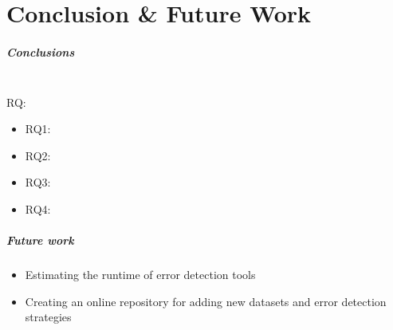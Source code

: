 \chapter{Conclusion \& Future Work}
\label{chap:conclusion}

\paragraph{Conclusions}
~\\RQ: 

\begin{itemize}
    \item RQ1:
    \item RQ2:
    \item RQ3:
    \item RQ4:
\end{itemize}

\paragraph{Future work}
\begin{itemize}
    \item Estimating the runtime of error detection tools
    \item Creating an online repository for adding new datasets and error detection strategies
\end{itemize}

